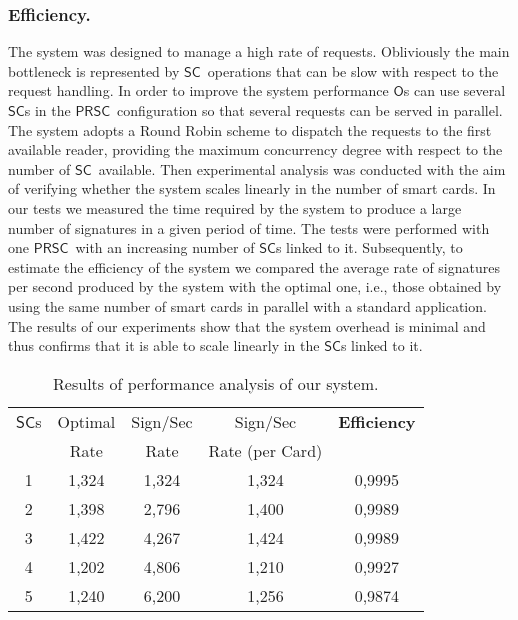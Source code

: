 \documentclass[preprint,authoryear,12pt]{elsarticle}
\newcommand{\Owner}{\ensuremath{\mathsf{O}}}
\newcommand{\SC}{\ensuremath{\mathsf{SC}}}
\newcommand{\PRSC}{\ensuremath{\mathsf{PRSC}}}
\begin{document}
\subsubsection{Efficiency.}
The system was designed to manage a high rate of requests. Obliviously the main bottleneck is represented by \SC\ operations that can be slow with respect to the request handling. In order to improve the system performance \Owner s can use several \SC s in the \PRSC\  configuration so that several requests can be served in parallel. The system adopts a Round Robin scheme to dispatch the requests to the first available reader, providing the maximum concurrency degree with respect to the number of \SC\  available. Then experimental analysis was conducted with the aim of verifying whether the system scales linearly in the number of smart cards. In our tests we measured the time required by the system to produce a large number of signatures in a given period of time. The tests were performed with one \PRSC\ with  an increasing number of \SC s linked to it. Subsequently, to estimate the efficiency of the system we compared the average rate of signatures per second produced by the system with the optimal one, i.e., those obtained by using the same number of smart cards in parallel with a standard application. The results of our experiments  show that the system overhead is minimal and thus confirms that it is able to scale linearly in the \SC s linked to it. 

\begin{table}[htdp]
\caption{Results of performance analysis of our system.}
\begin{center}
\begin{tabular}{ |  c  | c | c | c | c |}
 \hline
	
 \SC s & Optimal& Sign/Sec  & Sign/Sec  &  \textbf{Efficiency} \\
   & Rate &  Rate & Rate (per Card) &  \\
 \hline
1 & 1,324 & 1,324 & 1,324 & 0,9995 \\
2 & 1,398 & 2,796 & 1,400 & 0,9989 \\
3 & 1,422 & 4,267 & 1,424 & 0,9989 \\
4 & 1,202 & 4,806 & 1,210 & 0,9927 \\
5 & 1,240 & 6,200 & 1,256 & 0,9874 \\
 \hline
\end{tabular}
\end{center}
\label{tabexp}
\end{table}%
\end{document}
